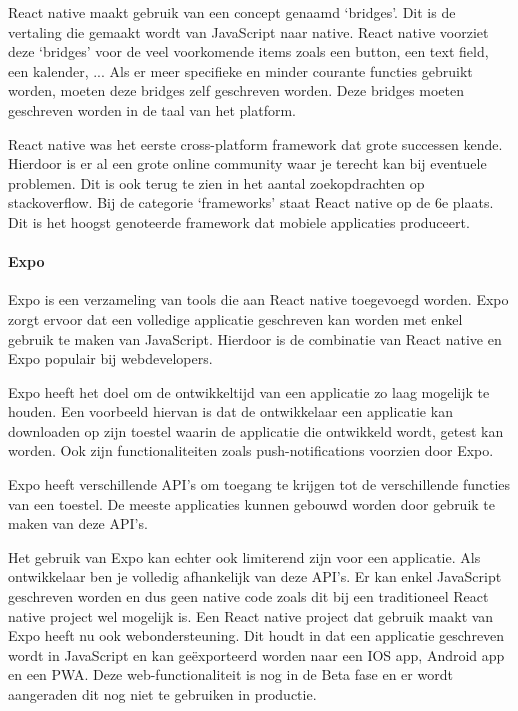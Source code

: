 		React native maakt gebruik van een concept genaamd ‘bridges’. Dit is de vertaling die gemaakt wordt van JavaScript naar native. React native voorziet deze ‘bridges’ voor de veel voorkomende items zoals een button, een text field, een kalender, ... Als er meer specifieke en minder courante functies gebruikt worden, moeten deze bridges zelf geschreven worden. Deze bridges moeten geschreven worden in de taal van het platform. 
		\autocite{Bartosz2019}
		
		React native was het eerste cross-platform framework dat grote successen kende. Hierdoor is er al een grote online community waar je terecht kan bij eventuele problemen. Dit is ook terug te zien in het aantal zoekopdrachten op stackoverflow. Bij de categorie ‘frameworks’ staat React native op de 6e plaats. Dit is het hoogst genoteerde framework dat mobiele applicaties produceert.
		\autocite{StackOverflow2020}
		
		
		\paragraph{Expo}
			Expo is een verzameling van tools die aan React native toegevoegd worden. Expo zorgt ervoor dat een volledige applicatie geschreven kan worden met enkel gebruik te maken van JavaScript. Hierdoor is de combinatie van React native en Expo populair bij webdevelopers.
			
			Expo heeft het doel om de ontwikkeltijd van een applicatie zo laag mogelijk te houden. Een voorbeeld hiervan is dat de ontwikkelaar een applicatie kan downloaden op zijn toestel waarin de applicatie die ontwikkeld wordt, getest kan worden. Ook zijn functionaliteiten zoals push-notifications voorzien door Expo.
			
			Expo heeft verschillende API’s om toegang te krijgen tot de verschillende functies van een toestel. De meeste applicaties kunnen gebouwd worden door gebruik te maken van deze API's. 
			
			Het gebruik van Expo kan echter ook limiterend zijn voor een applicatie. Als ontwikkelaar ben je volledig afhankelijk van deze API’s. Er kan enkel JavaScript geschreven worden en dus geen native code zoals dit bij een traditioneel React native project wel mogelijk is.
			Een React native project dat gebruik maakt van Expo heeft nu ook webondersteuning. Dit houdt in dat een applicatie geschreven wordt in JavaScript en kan geëxporteerd worden naar een IOS app, Android app en een PWA. 
			Deze web-functionaliteit is nog in de Beta fase en er wordt aangeraden dit nog niet te gebruiken in productie.
			\autocite{Expo2020}


